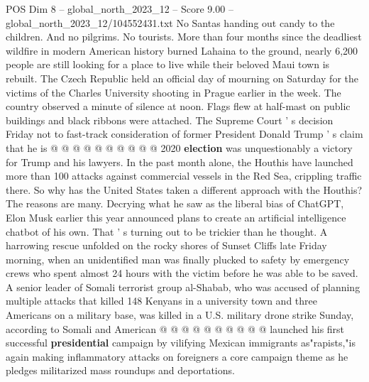 \begin{textsample}{POS Dim 8 – global\_north\_2023\_12 – Score 9.00 – global\_north\_2023\_12/104552431.txt}
No Santas handing out candy to the children.
And no pilgrims.
No tourists.
More than four months since the deadliest wildfire in modern American history burned Lahaina to the ground, nearly 6,200 people are still looking for a place to live while their beloved Maui town is rebuilt.
The Czech Republic held an official day of mourning on Saturday for the victims of the Charles University shooting in Prague earlier in the week.
The country observed a minute of silence at noon.
Flags flew at half-mast on public buildings and black ribbons were attached.
The Supreme Court ' s decision Friday not to fast-track consideration of former President Donald Trump ' s claim that he is @ @ @ @ @ @ @ @ @ @ 2020 \textbf{election} was unquestionably a victory for Trump and his lawyers.
In the past month alone, the Houthis have launched more than 100 attacks against commercial vessels in the Red Sea, crippling traffic there.
So why has the United States taken a different approach with the Houthis?
The reasons are many.
Decrying what he saw as the liberal bias of ChatGPT, Elon Musk earlier this year announced plans to create an artificial intelligence chatbot of his own.
That ' s turning out to be trickier than he thought.
A harrowing rescue unfolded on the rocky shores of Sunset Cliffs late Friday morning, when an unidentified man was finally plucked to safety by emergency crews who spent almost 24 hours with the victim before he was able to be saved.
A senior leader of Somali terrorist group al-Shabab, who was accused of planning multiple attacks that killed 148 Kenyans in a university town and three Americans on a military base, was killed in a U.S. military drone strike Sunday, according to Somali and American @ @ @ @ @ @ @ @ @ @ launched his first successful \textbf{presidential} campaign by vilifying Mexican immigrants as"rapists,"is again making inflammatory attacks on foreigners a core campaign theme as he pledges militarized mass roundups and deportations.

\end{textsample}
